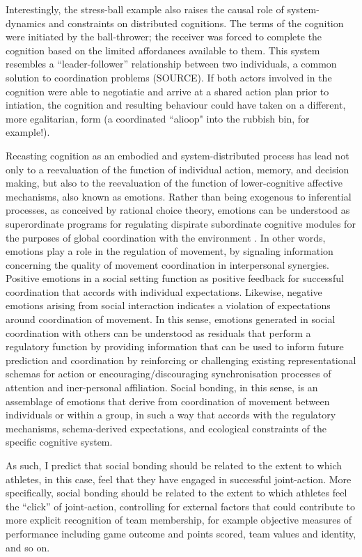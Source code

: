 \documentclass[12pt]{report}
\begin{document}
Interestingly, the stress-ball example also raises the causal role of system-dynamics and constraints on distributed cognitions. The terms of the cognition were initiated by the ball-thrower; the receiver was forced to complete the cognition based on the limited affordances available to them. This system resembles a ``leader-follower'' relationship between two individuals, a common solution to coordination problems (SOURCE).  If both actors involved in the cognition were able to negotiatie and arrive at a shared action plan prior to intiation, the cognition and resulting behaviour could have taken on a different, more egalitarian, form (a coordinated ``alioop" into the rubbish bin, for example!).

Recasting cognition as an embodied and system-distributed process has lead not only to a reevaluation of the function of individual action, memory, and decision making, but also to the reevaluation of the function of lower-cognitive affective mechanisms, also known as emotions.  Rather than being exogenous to inferential processes, as conceived by rational choice theory, emotions can be understood as superordinate programs for regulating dispirate subordinate cognitive modules for the purposes of global coordination with the environment \citep{Cosmides2000}.  In other words, emotions play a role in the regulation of movement, by signaling information concerning the quality of movement coordination in interpersonal synergies.   Positive emotions in a social setting function as positive feedback for successful coordination that accords with individual expectations.  Likewise, negative emotions arising from social interaction indicates a violation of expectations around coordination of movement.  In this sense, emotions generated in social coordination with others can be understood as residuals that perform a regulatory function by providing information that can be used to inform future prediction and coordination by reinforcing or challenging existing representational schemas for action or encouraging/discouraging synchronisation processes of attention and iner-personal affiliation.  Social bonding, in this sense, is an assemblage of emotions that derive from coordination of movement between individuals or within a group, in such a way that accords with the regulatory mechanisms, schema-derived expectations, and ecological constraints of the specific cognitive system.

As such, I predict that social bonding should be related to the extent to which athletes, in this case, feel that they have engaged in successful joint-action.  More specifically, social bonding should be related to the extent to which athletes feel the ``click'' of joint-action, controlling for external factors that could contribute to more explicit recognition of team membership, for example objective measures of performance including game outcome and points scored, team values and identity, and so on.
\end{document}
